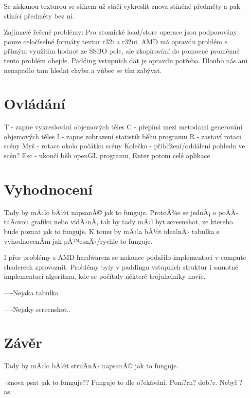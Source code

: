 \documentclass[a4paper, 12pt]{article}
\begin{document}
Se získanou texturou se stínem už stačí vykreslit znova stíněné předměty a pak stínící předměty bez ní.

Zajímavé řešené problémy:
Pro atomické load/store operace jsou podporovány pouze celočíselné formáty textur r32i a r32ui.
AMD má opravdu problém s přímým využitím hodnot ze SSBO pole, ale zkopírování do pomocné proměnné tento problém obejde.
Padding vstupních dat je opravdu potřeba. Dlouho nás ani nenapadlo tam hledat chybu a vůbec se tím zabývat. 


\section{Ovládání­}

T - zapne vykreslování objemových těles
C - přepíná mezi metodami generování objemových těles
I - zapne zobrazení statistik běhu programu
R - zastaví rotaci scény
Myš - rotace okolo počátku scény
Kolečko - přiblížení/oddálení pohledu ve scén?
Esc - ukončí běh openGL programu, Enter potom celé aplikace


\section{Vyhodnocení­}

Tady by mÄ›lo bÃ½t napsanÃ© jak to funguje. ProtoÅ¾e se jednÃ¡ o poÄÃ­taÄovou grafiku nebo 
vidÄ›nÃ­, tak by tady mÄ›l byt screenshot, ze ktereho bude poznat jak to funguje.
K tomu by mÄ›la bÃ½t idealnÄ› tabulka s vyhodnocenÃ­m jak pÅ™esnÄ›/rychle to funguje. 

I přes problémy s AMD hardwarem se nakonec podařilo implementaci v compute shaderech zprovoznit.
Problémy byly v paddingu vstupních struktur i samotné implementaci algoritmu, kde se počítaly
některé trojuhelníky navíc. 

----Nejaka tabulka

----Nejaky screenshot..


\section{Závěr}

Tady by mÄ›lo bÃ½t struÄnÄ› napsanÃ© jak to funguje.

--znova psat jak to funguje?? 
Funguje to dle o?ekávání. Pom?rn? dob?e. Nebyl ?as.


\begin{flushleft}
  
\end{flushleft}

\end{document}
